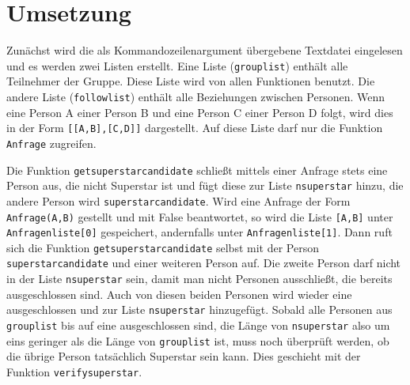 \documentclass[a4paper,10pt,ngerman]{scrartcl}
\begin{document}
\section{Umsetzung}
Zunächst wird die als Kommandozeilenargument übergebene Textdatei eingelesen und es werden zwei Listen erstellt. Eine Liste (\lstinline|grouplist|) enthält alle Teilnehmer der Gruppe. Diese Liste wird von allen Funktionen benutzt. Die andere Liste (\lstinline|followlist|) enthält alle Beziehungen zwischen Personen. Wenn eine Person A einer Person B und eine Person C einer Person D folgt, wird dies in der Form \lstinline|[[A,B],[C,D]]| dargestellt. Auf diese Liste darf nur die Funktion \lstinline|Anfrage| zugreifen.

Die Funktion \lstinline|getsuperstarcandidate| schließt mittels einer Anfrage stets eine Person aus, die nicht Superstar ist und fügt diese zur Liste \lstinline|nsuperstar| hinzu, die andere Person wird \lstinline|superstarcandidate|.
Wird eine Anfrage der Form \lstinline|Anfrage(A,B)| gestellt und mit False beantwortet, so wird die Liste \lstinline|[A,B]| unter \lstinline|Anfragenliste[0]| gespeichert, andernfalls unter \lstinline|Anfragenliste[1]|.
Dann ruft sich die Funktion \lstinline|getsuperstarcandidate| selbst mit der Person \lstinline|superstarcandidate| und einer weiteren Person auf. Die zweite Person darf nicht in der Liste \lstinline|nsuperstar| sein, damit man nicht Personen ausschließt, die bereits ausgeschlossen sind. Auch von diesen beiden Personen wird wieder eine ausgeschlossen und zur Liste \lstinline|nsuperstar| hinzugefügt.
Sobald alle Personen aus \lstinline|grouplist| bis auf eine ausgeschlossen sind, die Länge von \lstinline|nsuperstar| also um eins geringer als die Länge von \lstinline|grouplist| ist, muss noch überprüft werden, ob die übrige Person tatsächlich Superstar sein kann.
Dies geschieht mit der Funktion \lstinline|verifysuperstar|.
\end{document}
